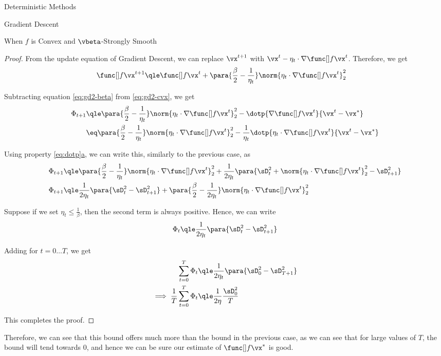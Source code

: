 \documentclass{article}
\begin{document}
\begin{psection}{Deterministic Methods}
\begin{psubsection}{Gradient Descent}
\begin{pssubsection}{When $f$ is Convex and $\vbeta$-Strongly Smooth}
\begin{theorem}
\begin{proof}
					From the update equation of Gradient Descent, we can replace $\x{t + 1}$ with $\x{t} - \eta_t \cdot \gf{t}$. Therefore, we get
					\begin{align}
						\f{t + 1}	&\qle	\f{t} + \para{\frac{\beta}{2} - \frac{1}{\eta_t}} \norm{\eta_t \cdot \gf{t}}_2^2 \label{eq:gd2-cvx}
					\end{align}

					Subtracting equation \ref{eq:gd2-beta} from \ref{eq:gd2-cvx}, we get
					\begin{align*}
						\Phi_{t + 1}	&\qle	\para{\frac{\beta}{2} - \frac{1}{\eta_t}} \norm{\eta_t \cdot \gf{t}}_2^2 - \dotp{\gf{t}}{\x{t} - \xs} \\
						&\eq	\para{\frac{\beta}{2} - \frac{1}{\eta_t}} \norm{\eta_t \cdot \gf{t}}_2^2 - \frac{1}{\eta_t} \dotp{\eta_t \cdot \gf{t}}{\x{t} - \xs}
					\end{align*}

					Using property \hyperref[eq:dotp]{\ref*{eq:dotp}a}, we can write this, similarly to the previous case, as
					\begin{align*}
						\Phi_{t + 1}	&\qle	\para{\frac{\beta}{2} - \frac{1}{\eta_t}} \norm{\eta_t \cdot \gf{t}}_2^2 + \frac{1}{2 \eta_t} \para{\sD_t^2 + \norm{\eta_t \cdot \gf{t}}_2^2 - \sD_{t + 1}^2} \\
						\Phi_{t + 1}	&\qle	\frac{1}{2 \eta_t} \para{\sD_t^2 - \sD_{t + 1}^2} + \para{\frac{\beta}{2} - \frac{1}{2 \eta_t}} \norm{\eta_t \cdot \gf{t}}_2^2
					\end{align*}

					Suppose if we set $\eta_t \le \frac{1}{\beta}$, then the second term is always positive. Hence, we can write
					\begin{align*}
						\Phi_t	\qle	\frac{1}{2 \eta_t} \para{\sD_t^2 - \sD_{t + 1}^2}
					\end{align*}

					Adding for $t = 0 \dots T$, we get
					\begin{align*}
						\sum_{t = 0}^T	\Phi_t						&\qle	\frac{1}{2 \eta_t} \para{\sD_0^2 - \sD_{T + 1}^2} \\
						\implies \frac{1}{T} \sum_{t = 0}^T	\Phi_t	&\qle	\frac{1}{2 \eta} \frac{\sD_0^2}{T}
					\end{align*}

					This completes the proof.
				\end{proof}
			\end{theorem}

			Therefore, we can see that this bound offers much more than the bound in the previous case, as we can see that for large values of $T$, the bound will tend towards 0, and hence we can be sure our estimate of $\fs$ is good.


\end{pssubsection}
\end{psubsection}
\end{psection}
\end{document}
